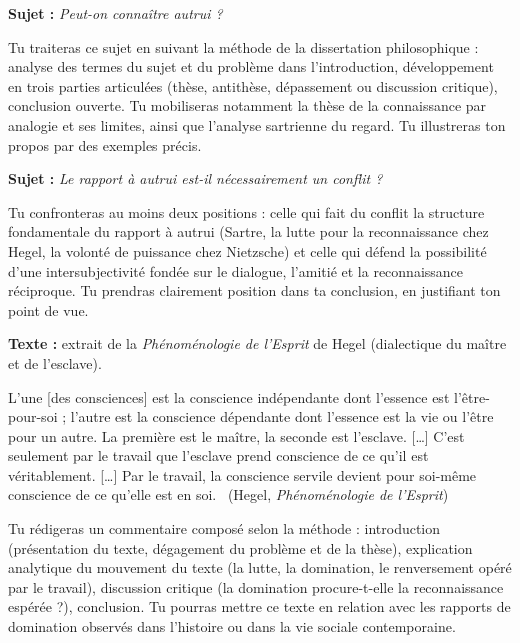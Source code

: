 \documentclass[11pt]{article}
\newcounter{popsec}
\newcounter{popsub}
\newcommand{\courssub}[1]{%
  \stepcounter{popsub}%
  \par\vspace{9pt}\noindent{\popxbold\fontsize{11.5}{13}\selectfont\color{popink}{\color{poporange}\thepopsec.\thepopsub}\hspace{6pt}#1}\par\nopagebreak\vspace{4pt}
}
\begin{document}
\courssub{Je me prépare au Bac}

\begin{exercice}
\textbf{Sujet :} \emph{Peut-on connaître autrui ?}

Tu traiteras ce sujet en suivant la méthode de la dissertation philosophique : analyse des termes du sujet et du problème dans l'introduction, développement en trois parties articulées (thèse, antithèse, dépassement ou discussion critique), conclusion ouverte. Tu mobiliseras notamment la thèse de la connaissance par analogie et ses limites, ainsi que l'analyse sartrienne du regard. Tu illustreras ton propos par des exemples précis.
\end{exercice}

\begin{exercice}
\textbf{Sujet :} \emph{Le rapport à autrui est-il nécessairement un conflit ?}

Tu confronteras au moins deux positions : celle qui fait du conflit la structure fondamentale du rapport à autrui (Sartre, la lutte pour la reconnaissance chez Hegel, la volonté de puissance chez Nietzsche) et celle qui défend la possibilité d'une intersubjectivité fondée sur le dialogue, l'amitié et la reconnaissance réciproque. Tu prendras clairement position dans ta conclusion, en justifiant ton point de vue.
\end{exercice}

\begin{exercice}
\textbf{Texte :} extrait de la \emph{Phénoménologie de l'Esprit} de Hegel (dialectique du maître et de l'esclave).

\guillemotleft L'une [des consciences] est la conscience indépendante dont l'essence est l'être-pour-soi ; l'autre est la conscience dépendante dont l'essence est la vie ou l'être pour un autre. La première est le maître, la seconde est l'esclave. [\ldots] C'est seulement par le travail que l'esclave prend conscience de ce qu'il est véritablement. [\ldots] Par le travail, la conscience servile devient pour soi-même conscience de ce qu'elle est en soi. \guillemotright\ (Hegel, \emph{Phénoménologie de l'Esprit})

Tu rédigeras un commentaire composé selon la méthode : introduction (présentation du texte, dégagement du problème et de la thèse), explication analytique du mouvement du texte (la lutte, la domination, le renversement opéré par le travail), discussion critique (la domination procure-t-elle la reconnaissance espérée ?), conclusion. Tu pourras mettre ce texte en relation avec les rapports de domination observés dans l'histoire ou dans la vie sociale contemporaine.
\end{exercice}
\end{document}
